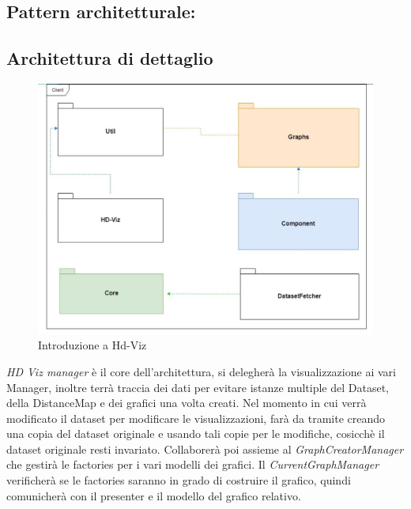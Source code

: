 \documentclass[../manuale_sviluppatore.tex]{subfiles}
\begin{document}
\subsection{Pattern architetturale: }

\subsection{Architettura di dettaglio}

\begin{figure}[H]
	\centering
	\includegraphics[width=18cm]{img/core.jpg}
	\caption{Introduzione a Hd-Viz}
\end{figure}

\emph{HD Viz manager} è il core dell'architettura, si delegherà la visualizzazione ai vari Manager, inoltre terrà traccia 
dei dati per evitare istanze multiple del Dataset, della DistanceMap e dei grafici una volta creati. Nel momento in cui 
verrà modificato il dataset per modificare le visualizzazioni, farà da tramite creando una copia del dataset originale e usando
tali copie per le modifiche, cosicchè il dataset originale resti invariato.
Collaborerà poi assieme al \emph{GraphCreatorManager} che gestirà le factories per i vari modelli dei grafici. 
Il \emph{CurrentGraphManager} verificherà se le factories saranno in grado di costruire il grafico, quindi comunicherà con il 
presenter e il modello del grafico relativo. \\
\end{document}
